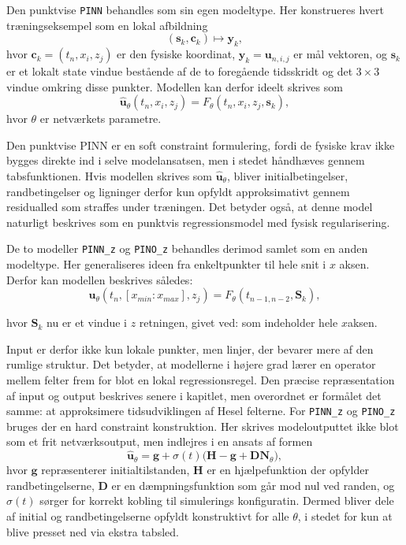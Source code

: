 Den punktvise \texttt{PINN} behandles som sin egen modeltype. Her konstrueres hvert træningseksempel som en lokal afbildning
\[
(\mathbf{s}_k,\mathbf{c}_k)\mapsto \mathbf{y}_k,
\]
hvor \(\mathbf{c}_k=(t_n,x_i,z_j)\) er den fysiske koordinat, \(\mathbf{y}_k=\mathbf{u}_{n,i,j}\) er mål vektoren, og \(\mathbf{s}_k\) er et lokalt state vindue bestående 
af de to foregående tidsskridt og det \(3\times 3\) vindue omkring disse punkter. Modellen kan derfor ideelt skrives som
\[
\hat{\mathbf{u}}_\theta(t_n, x_i,z_j)
=
F_\theta\!\left(t_n, x_i,z_j,\mathbf{s}_k\right),
\]
hvor \(\theta\) er netværkets parametre.

Den punktvise PINN er en soft constraint formulering, fordi de fysiske krav ikke bygges direkte ind i selve modelansatsen, men i stedet håndhæves gennem tabsfunktionen. Hvis modellen skrives som \(\hat{\mathbf{u}}_\theta\), bliver initialbetingelser, randbetingelser og ligninger derfor kun opfyldt approksimativt gennem residualled som straffes under træningen.
Det betyder også, at denne model naturligt beskrives som en punktvis regressionsmodel med fysisk regularisering.

De to modeller \texttt{PINN\_z} og \texttt{PINO\_z} behandles derimod samlet som en anden modeltype.
Her generaliseres ideen fra enkeltpunkter til hele snit i \(x\) aksen. Derfor kan modellen beskrives således:
\[
\hat{\mathbf{u}}_\theta(t_n,\left[x_{min}:x_{max}\right], z_j) = F_\theta\!\left(t_{n-1, n-2}, \mathbf{S}_k\right),
\]

hvor \(\mathbf{S}_k\) nu er et vindue i \(z\) retningen, givet ved: 
som indeholder hele $x$aksen.


Input er derfor ikke kun lokale punkter, men linjer, der bevarer mere af den rumlige struktur. Det betyder, at modellerne i højere grad lærer en operator mellem felter frem for blot en lokal regressionsregel. Den præcise repræsentation af input og output beskrives senere i kapitlet, men overordnet er formålet det samme: at approksimere tidsudviklingen af Hesel felterne.
For \texttt{PINN\_z} og \texttt{PINO\_z} bruges der en hard constraint konstruktion. Her skrives modeloutputtet ikke blot som et frit netværksoutput, men indlejres i en ansats af formen
\[
\hat{\mathbf{u}}_\theta = \mathbf{g} + \sigma(t)\bigl(\mathbf{H} - \mathbf{g} + \mathbf{D} \mathbf{N}_\theta\bigr),
\]
hvor \(\mathbf{g}\) repræsenterer initialtilstanden, \(\mathbf{H}\) er en hjælpefunktion der opfylder randbetingelserne, \(\mathbf{D}\) er en dæmpningsfunktion som går mod nul ved randen, og \(\sigma(t)\) sørger for korrekt kobling til simulerings konfiguratin. Dermed bliver dele af initial og randbetingelserne opfyldt konstruktivt for alle \(\theta\), i stedet for kun at blive presset ned via ekstra tabsled.

